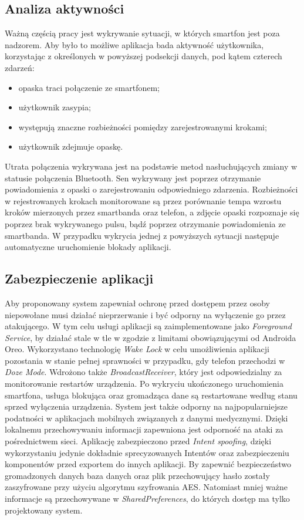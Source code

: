 \subsection{Analiza aktywności}
Ważną częścią pracy jest wykrywanie sytuacji, w których smartfon jest poza nadzorem. Aby było to możliwe
aplikacja bada aktywność użytkownika, korzystając z określonych w powyższej podsekcji danych, pod kątem czterech zdarzeń:
\begin{itemize}
    \item opaska traci połączenie ze smartfonem;
    \item użytkownik zasypia;
    \item występują znaczne rozbieżności pomiędzy zarejestrowanymi krokami;
    \item użytkownik zdejmuje opaskę.
\end{itemize}

\indent Utrata połączenia wykrywana jest na podstawie metod nasłuchujących zmiany w statusie połączenia Bluetooth. Sen wykrywany jest poprzez
otrzymanie powiadomienia z opaski o zarejestrowaniu odpowiedniego zdarzenia. Rozbieżności
w rejestrowanych krokach monitorowane są przez porównanie tempa wzrostu kroków mierzonych przez smartbanda oraz telefon, a zdjęcie opaski rozpoznaje się
poprzez brak wykrywanego pulsu, bądź poprzez otrzymanie powiadomienia ze smartbanda. W przypadku wykrycia jednej z powyższych sytuacji następuje
automatyczne uruchomienie blokady aplikacji.

\subsection{Zabezpieczenie aplikacji}
Aby proponowany system zapewniał ochronę przed dostępem przez osoby niepowołane musi działać nieprzerwanie i być odporny na wyłączenie go przez atakującego. W tym celu usługi aplikacji są zaimplementowane jako \textit{Foreground Service}, by
działać stale w tle w zgodzie z limitami obowiązującymi od Androida Oreo\cite{BGLimitsOreo}. Wykorzystano technologię \textit{Wake Lock}\cite{WakeLock} w celu umożliwienia aplikacji pozostania w stanie pełnej sprawności
w przypadku, gdy telefon przechodzi w \textit{Doze Mode}\cite{DozeMode}. Wdrożono także \textit{BroadcastReceiver}, który jest
odpowiedzialny za monitorowanie restartów urządzenia. Po wykryciu ukończonego uruchomienia smartfona, usługa blokująca oraz gromadząca dane
są restartowane według stanu sprzed wyłączenia urządzenia.
\newline\newline
\indent System jest także odporny na najpopularniejsze podatności w aplikacjach mobilnych związanych z danymi medycznymi\cite{Security-Mobile-Health-Apps}. Dzięki lokalnemu przechowywaniu informacji zapewniona jest odporność na ataki za pośrednictwem sieci. Aplikację zabezpieczono przed \textit{Intent spoofing}, dzięki wykorzystaniu jedynie dokładnie sprecyzowanych Intentów oraz zabezpieczeniu komponentów przed exportem do innych aplikacji. By zapewnić bezpieczeństwo gromadzonych danych baza danych oraz plik przechowujący hasło zostały zaszyfrowane przy użyciu algorytmu szyfrowania AES. Natomiast mniej ważne informacje są przechowywane w \textit{SharedPreferences}, do których dostęp ma tylko projektowany system.
